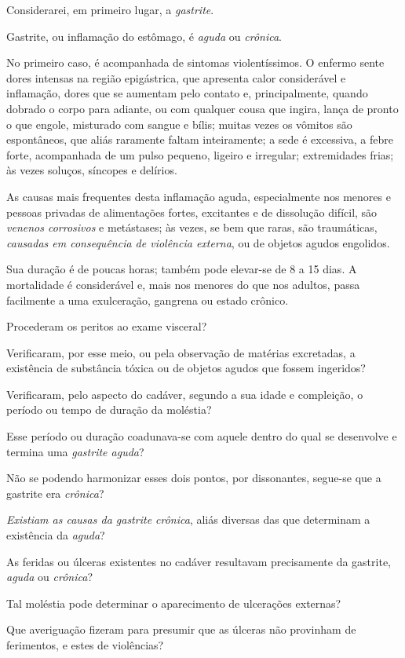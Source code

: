 Considerarei, em primeiro lugar, a \emph{gastrite}.

Gastrite, ou inflamação do estômago, é \emph{aguda} ou \emph{crônica}.

No primeiro caso, é acompanhada de sintomas violentíssimos. O enfermo
sente dores intensas na região epigástrica, que apresenta calor
considerável e inflamação, dores que se aumentam pelo contato e,
principalmente, quando dobrado o corpo para adiante, ou com qualquer
cousa que ingira, lança de pronto o que engole, misturado com sangue e
bílis; muitas vezes os vômitos são espontâneos, que aliás raramente
faltam inteiramente; a sede é excessiva, a febre forte, acompanhada de
um pulso pequeno, ligeiro e irregular; extremidades frias; às vezes
soluços, síncopes e delírios.

As causas mais frequentes desta inflamação aguda, especialmente nos
menores e pessoas privadas de alimentações fortes, excitantes e de
dissolução difícil, são \emph{venenos corrosivos} e metástases; às
vezes, se bem que raras, são traumáticas, \emph{causadas em consequência
de violência externa}, ou de objetos agudos engolidos.

Sua duração é de poucas horas; também pode elevar-se de 8 a 15 dias. A
mortalidade é considerável e, mais nos menores do que nos adultos, passa
facilmente a uma exulceração, gangrena ou estado crônico.

Procederam os peritos ao exame visceral?

Verificaram, por esse meio, ou pela observação de matérias excretadas, a
existência de substância tóxica ou de objetos agudos que fossem
ingeridos?

Verificaram, pelo aspecto do cadáver, segundo a sua idade e compleição,
o período ou tempo de duração da moléstia?

Esse período ou duração coadunava-se com aquele dentro do qual se
desenvolve e termina uma \emph{gastrite aguda}?

Não se podendo harmonizar esses dois pontos, por dissonantes, segue-se
que a gastrite era \emph{crônica}?

\emph{Existiam as causas da gastrite crônica}, aliás diversas das que
determinam a existência da \emph{aguda}?

As feridas ou úlceras existentes no cadáver resultavam precisamente da
gastrite, \emph{aguda} ou \emph{crônica}?

Tal moléstia pode determinar o aparecimento de ulcerações externas?

Que averiguação fizeram para presumir que as úlceras não provinham de
ferimentos, e estes de violências?

